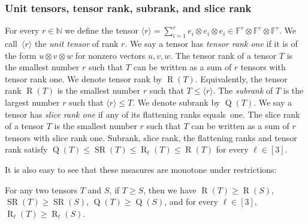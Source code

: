 \documentclass[11pt]{article}
\DeclareMathOperator{\subrank}{Q}
\DeclareMathOperator{\slicerank}{SR}
\DeclareMathOperator{\tensorrank}{R}
\newcommand{\FF}{\mathbb{F}}
\newcommand{\NN}{\mathbb{N}}
\begin{document}
%
%
%
%
%
%
%
%

\subsubsection*{Unit tensors, tensor rank, subrank, and slice rank}
For every $r \in \NN$ we define the tensor $\langle r \rangle = \sum_{i=1}^r e_i \otimes e_i \otimes e_i \in \FF^r \otimes \FF^r \otimes \FF^r$. We call~$\langle r \rangle$ the \emph{unit tensor} of rank $r$.
We say a tensor has \emph{tensor rank one} if it is of the form $u \otimes v \otimes w$ for nonzero vectors $u,v,w$.
The tensor rank of a tensor $T$ is the smallest number $r$ such that $T$ can be written as a sum of $r$ tensors with tensor rank one. 
%
We denote tensor rank by $\tensorrank(T)$. Equivalently, the tensor rank $\tensorrank(T)$ is the smallest number $r$ such that $T \leq \langle r\rangle$. The \emph{subrank} of $T$ is the largest number $r$ such that $\langle r\rangle \leq T$. We denote subrank by $\subrank(T)$. 
We say a tensor has \emph{slice rank one} if any of its flattening ranks equals~one. The slice rank of a tensor $T$ is the smallest number $r$ such that $T$ can be written as a sum of $r$ tensors with slice rank one.
%
Subrank, slice rank, the flattening ranks and tensor rank satisfy $\subrank(T) \leq \slicerank(T) \leq \tensorrank_\ell(T) \leq \tensorrank(T)$ for every $\ell\in [3]$.

It is also easy to see that these measures are monotone under restrictions:

\begin{lemma}\label{lem:monotone-restrict}
    For any two tensors $T$ and $S$, if $T\geq S$, then we have $\tensorrank(T)\geq \tensorrank(S)$, $\slicerank(T)\geq \slicerank(S)$, $\subrank(T)\geq \subrank(S)$, and for every $\ell\in[3]$, %
    $\tensorrank_\ell(T)\geq \tensorrank_\ell(S)$.
\end{lemma}
\end{document}
